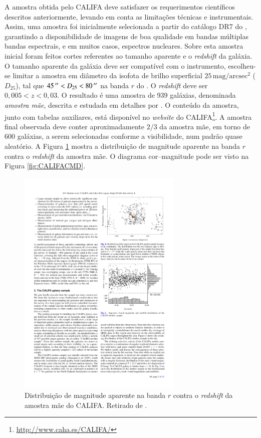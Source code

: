 A amostra obtida pelo CALIFA deve satisfazer os requerimentos científicos
descritos anteriormente, levando em conta as limitações técnicas e
instrumentais. Assim, uma amostra foi inicialmente selecionada a partir do
catálogo DR7 do \SDSS \citep{Abazajian2009}, garantindo a disponibilidade de
imagens de boa qualidade em bandas múltiplas bandas espectrais, e em muitos
casos, espectros nucleares. Sobre esta amostra inicial foram feitos cortes
referentes ao tamanho aparente e o {\em redshift} da galáxia. O tamanho aparente
da galáxia deve ser compatível com o instrumento, escolheu-se limitar a amostra
em diâmetro da isofota de brilho superficial
$25\,\mathrm{mag}/\mathrm{arcsec}^2$ ($D_{25}$), tal que $45\,^{\prime\prime} < D_{25} <
80\,^{\prime\prime}$ na banda $r$ do \SDSS. O {\em redshift} deve ser $0,005 < z < 0,03$.
O resultado é uma amostra de 939 galáxias, denominada {\em amostra mãe},
descrita e estudada em detalhes por \citet{Walcher2014}. O conteúdo da amostra,
junto com tabelas auxiliares, está disponível no {\em website} do
CALIFA\footnote{\url{http://www.caha.es/CALIFA/}}. A amostra final observada
deve conter aproximadamente $2/3$ da amostra mãe, em torno de 600 galáxias, a
serem selecionadas conforme a visibilidade, num padrão quase aleatório. A Figura
\ref{fig:CALIFASample} mostra a distribuição de magnitude aparente na banda $r$
contra o {\em redshift} da amostra mãe. O diagrama cor--magnitude pode ser visto
na Figura \ref{fig:CALIFACMD}.

\begin{figure}
	\includegraphics[width=0.7\textwidth]{figuras/CALIFASample}
	\caption[Distribuição de magnitude $r$ contra {\em redshift} da amostra mãe
	do CALIFA] {Distribuição de magnitude aparente na banda $r$ contra o {\em
	redshift} da amostra mãe do CALIFA. Retirado de \citet{Sanchez2012}.}
	\label{fig:CALIFASample}
\end{figure}

